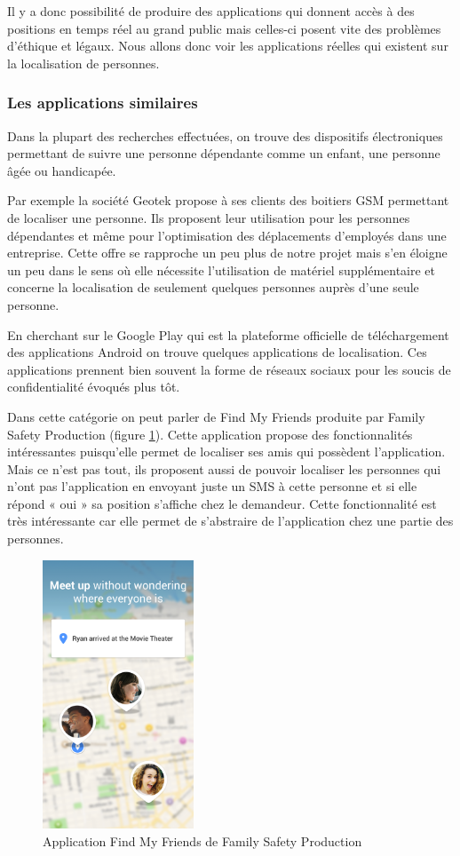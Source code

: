 Il y a donc possibilité de produire des applications qui donnent accès à des positions en temps réel au grand public mais celles-ci posent vite des problèmes d’éthique et légaux. Nous allons donc voir les applications réelles qui existent sur la localisation de personnes.

\subsubsection{Les applications similaires}

Dans la plupart des recherches effectuées, on trouve des dispositifs électroniques permettant de suivre une personne dépendante comme un enfant, une personne âgée ou handicapée.

Par exemple la société Geotek propose à ses clients des boitiers GSM permettant de localiser une personne. Ils proposent leur utilisation pour les personnes dépendantes et même pour l’optimisation des déplacements d’employés dans une entreprise. Cette offre se rapproche un peu plus de notre projet mais s’en éloigne un peu dans le sens où elle nécessite l’utilisation de matériel supplémentaire et concerne la localisation de seulement quelques personnes auprès d’une seule personne.

En cherchant sur le Google Play qui est la plateforme officielle de téléchargement des applications Android on trouve quelques applications de localisation. Ces applications prennent bien souvent la forme de réseaux sociaux pour les soucis de confidentialité évoqués plus tôt.

Dans cette catégorie on peut parler de Find My Friends produite par Family Safety Production (figure \ref{findmyfriends}). Cette application propose des fonctionnalités intéressantes puisqu’elle permet de localiser ses amis qui possèdent l’application. Mais ce n’est pas tout, ils proposent aussi de pouvoir localiser les personnes qui n’ont pas l’application en envoyant juste un SMS à cette personne et si elle répond « oui » sa position s’affiche chez le demandeur. Cette fonctionnalité est très intéressante car elle permet de s’abstraire de l’application chez une partie des personnes.

\begin{figure}[H]
    \centering
    \includegraphics[height=8cm]{./img/findmyfriends.png}
    \caption{Application Find My Friends de Family Safety Production}
    \label{findmyfriends}
\end{figure}

